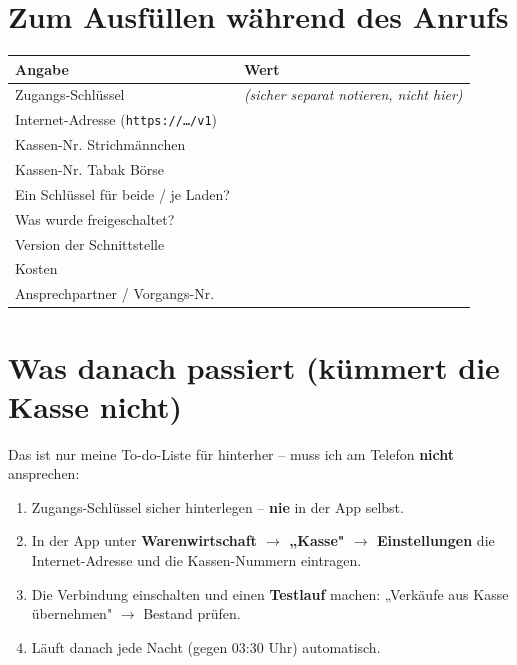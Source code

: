 \documentclass[11pt,a4paper]{article}
\newcommand{\code}[1]{\texttt{\small #1}}
\begin{document}
\section{Zum Ausfüllen während des Anrufs}
\renewcommand{\arraystretch}{1.9}
\noindent
\begin{tabular}{|>{\raggedright\arraybackslash}p{6.4cm}|p{9.2cm}|}
  \hline
  \rowcolor{hellgrau}\textbf{Angabe} & \textbf{Wert} \\ \hline
  Zugangs-Schlüssel & \emph{\small(sicher separat notieren, nicht hier)} \\ \hline
  Internet-Adresse (\code{https://\dots/v1}) & \\ \hline
  Kassen-Nr. Strichmännchen & \\ \hline
  Kassen-Nr. Tabak Börse & \\ \hline
  Ein Schlüssel für beide / je Laden? & \\ \hline
  Was wurde freigeschaltet? & \\ \hline
  Version der Schnittstelle & \\ \hline
  Kosten & \\ \hline
  Ansprechpartner / Vorgangs-Nr. & \\ \hline
\end{tabular}

\section{Was danach passiert (kümmert die Kasse nicht)}
Das ist nur meine To-do-Liste für hinterher – muss ich am Telefon \textbf{nicht} ansprechen:
\begin{enumerate}[leftmargin=1.6em]
  \item Zugangs-Schlüssel sicher hinterlegen – \textbf{nie} in der App selbst.
  \item In der App unter \textbf{Warenwirtschaft $\rightarrow$ „Kasse" $\rightarrow$ Einstellungen}
        die Internet-Adresse und die Kassen-Nummern eintragen.
  \item Die Verbindung einschalten und einen \textbf{Testlauf} machen:
        „Verkäufe aus Kasse übernehmen" $\rightarrow$ Bestand prüfen.
  \item Läuft danach jede Nacht (gegen 03:30 Uhr) automatisch.
\end{enumerate}
\end{document}

